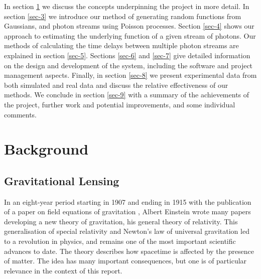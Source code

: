 \documentclass[a4paper,11pt]{article}
\begin{document}
  In section \ref{sec-2} we discuss the concepts underpinning the project in more
  detail. In section \ref{sec-3} we introduce our method of
  generating random functions from Gaussians, and photon streams using Poisson
  processes. Section \ref{sec-4} shows our approach to estimating the
  underlying function of a given stream of photons. Our methods of calculating
  the time delays between multiple photon streams are explained in section \ref{sec-5}. Sections \ref{sec-6} and \ref{sec-7} give detailed information on
  the design and development of the system, including the software and project
  management aspects. Finally, in section \ref{sec-8} we present
  experimental data from both simulated and real data and discuss the relative
  effectiveness of our methods. We conclude in section \ref{sec-9} with a summary
  of the achievements of the project, further work and potential improvements,
  and some individual comments.
\section{Background}
\label{sec-2}
\subsection{Gravitational Lensing}
\label{sec-2-1}

   In an eight-year period starting in 1907 and ending in 1915 with the
   publication of a paper on field equations of gravitation
   \cite{einstein1915general}, Albert Einstein wrote many papers developing a
   new theory of gravitation, his general theory of relativity. This
   generalisation of special relativity and Newton's law of universal
   gravitation led to a revolution in physics, and remains one of the most
   important scientific advances to date. The theory describes how spacetime is
   affected by the presence of matter. The idea has many important consequences,
   but one is of particular relevance in the context of this report.
\end{document}
